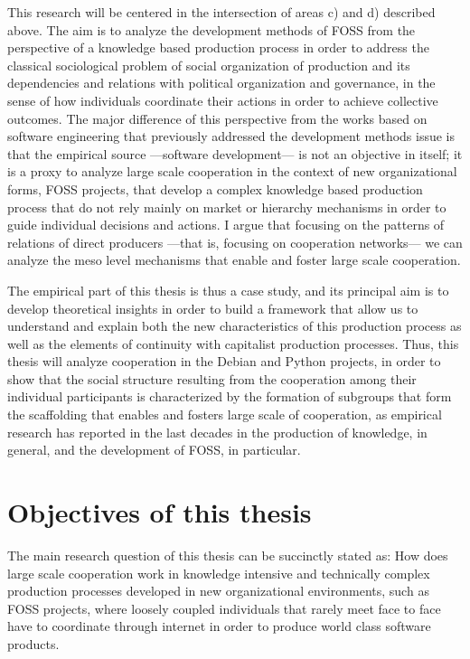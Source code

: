This research will be centered in the intersection of areas c) and d) described above. The aim is to analyze the development methods of FOSS from the perspective of a knowledge based production process in order to address the classical sociological problem of social organization of production and its dependencies and relations with political organization and governance, in the sense of how individuals coordinate their actions in order to achieve collective outcomes. The major difference of this perspective from the works based on software engineering that previously addressed the development methods issue is that the empirical source ---software development--- is not an objective in itself; it is a proxy to analyze large scale cooperation in the context of new organizational forms, FOSS projects, that develop a complex knowledge based production process that do not rely mainly on market or hierarchy mechanisms in order to guide individual decisions and actions. I argue that focusing on the patterns of relations of direct producers ---that is, focusing on cooperation networks--- we can analyze the meso level mechanisms that enable and foster large scale cooperation.

The empirical part of this thesis is thus a case study, and its principal aim is to develop theoretical insights in order to build a framework that allow us to understand and explain both the new characteristics of this production process as well as the elements of continuity with capitalist production processes. Thus, this thesis will analyze cooperation in the Debian and Python projects, in order to show that the social structure resulting from the cooperation among their individual participants is characterized by the formation of subgroups that form the scaffolding that enables and fosters large scale of cooperation, as empirical research has reported in the last decades in the production of knowledge, in general, and the development of FOSS, in particular.

\section{Objectives of this thesis}

The main research question of this thesis can be succinctly stated as: How does large scale cooperation work in knowledge intensive and technically complex production processes developed in new organizational environments, such as FOSS projects, where loosely coupled individuals that rarely meet face to face have to coordinate through internet in order to produce world class software products.

